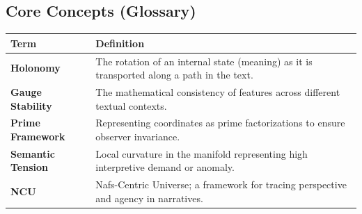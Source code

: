 \documentclass[12pt,a4paper]{article}
\begin{document}
\subsection{Core Concepts (Glossary)}\label{core-concepts-glossary}

{\def\LTcaptype{none} %
\begin{longtable}[]{@{}ll@{}}
\toprule\noalign{}
Term & Definition \\
\midrule\noalign{}
\endhead
\bottomrule\noalign{}
\endlastfoot
\textbf{Holonomy} & The rotation of an internal state (meaning) as it is
transported along a path in the text. \\
\textbf{Gauge Stability} & The mathematical consistency of features
across different textual contexts. \\
\textbf{Prime Framework} & Representing coordinates as prime
factorizations to ensure observer invariance. \\
\textbf{Semantic Tension} & Local curvature in the manifold representing
high interpretive demand or anomaly. \\
\textbf{NCU} & Nafs-Centric Universe; a framework for tracing
perspective and agency in narratives. \\
\end{longtable}
}
\end{document}
